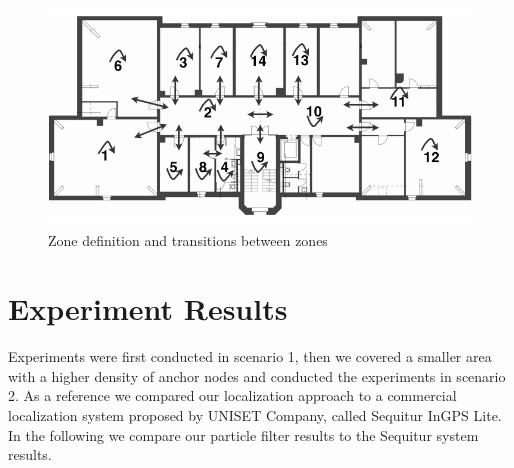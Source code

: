 \begin{figure}[th]
\centering
\includegraphics[width=1.0\textwidth]{Figures/zone_definition}
\decoRule
\caption[Zone Definition]{Zone definition and transitions between zones}
\label{fig:zone_definition}
\end{figure}

\section{Experiment Results}
Experiments were first conducted in scenario 1, then we covered a smaller area with a higher density of anchor nodes and conducted the experiments in scenario 2. As a reference we compared our localization approach to a commercial localization system proposed by UNISET Company, called Sequitur InGPS Lite. In the following we compare our particle filter results to the Sequitur system results.
